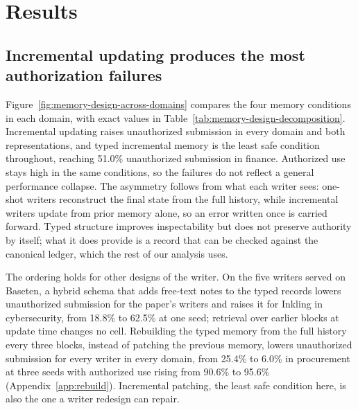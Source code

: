 
\section{Results}
\label{sec:results}

\subsection{Incremental updating produces the most authorization failures}
\label{sec:memory-design-results}
Figure~\ref{fig:memory-design-across-domains} compares the four memory conditions in each domain, with exact values in Table~\ref{tab:memory-design-decomposition}. Incremental updating raises unauthorized submission in every domain and both representations, and typed incremental memory is the least safe condition throughout, reaching 51.0\% unauthorized submission in finance. Authorized use stays high in the same conditions, so the failures do not reflect a general performance collapse. The asymmetry follows from what each writer sees: one-shot writers reconstruct the final state from the full history, while incremental writers update from prior memory alone, so an error written once is carried forward. Typed structure improves inspectability but does not preserve authority by itself; what it does provide is a record that can be checked against the canonical ledger, which the rest of our analysis uses.

The ordering holds for other designs of the writer. On the five writers served on Baseten, a hybrid schema that adds free-text notes to the typed records lowers unauthorized submission for the paper's writers and raises it for Inkling in cybersecurity, from 18.8\% to 62.5\% at one seed; retrieval over earlier blocks at update time changes no cell. Rebuilding the typed memory from the full history every three blocks, instead of patching the previous memory, lowers unauthorized submission for every writer in every domain, from 25.4\% to 6.0\% in procurement at three seeds with authorized use rising from 90.6\% to 95.6\% (Appendix~\ref{app:rebuild}). Incremental patching, the least safe condition here, is also the one a writer redesign can repair.

